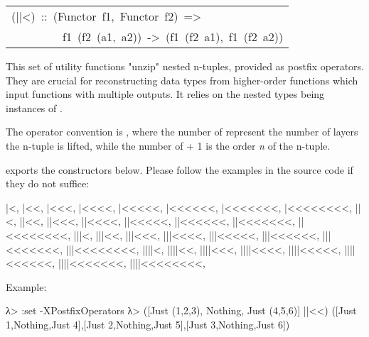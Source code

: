 \begin{haddockdesc}
\item[\begin{tabular}{@{}l}
(||<)\ ::\ (Functor\ f1,\ Functor\ f2)\ =>\\\ \ \ \ \ \ \ \ \ f1\ (f2\ (a1,\ a2))\ ->\ (f1\ (f2\ a1),\ f1\ (f2\ a2))
\end{tabular}]\haddockbegindoc
This set of utility functions "unzip" nested n-tuples, provided
 as postfix operators. They are crucial for reconstructing data
 types from higher-order functions which input functions with
 multiple outputs. It relies on the nested types being instances of
 .\par
The operator convention is \haddocktt{(|+<+)}, where the number of \haddocktt{|}
 represent the number of layers the n-tuple is lifted, while the
 number of \haddocktt{<} + 1 is the order \emph{n} of the n-tuple.\par
{} exports the constructors below. Please
 follow the examples in the source code if they do not suffice:\par
\begin{interactive}
   |<,    |<<,    |<<<,    |<<<<,    |<<<<<,    |<<<<<<,    |<<<<<<<,    |<<<<<<<<,
  ||<,   ||<<,   ||<<<,   ||<<<<,   ||<<<<<,   ||<<<<<<,   ||<<<<<<<,   ||<<<<<<<<,
 |||<,  |||<<,  |||<<<,  |||<<<<,  |||<<<<<,  |||<<<<<<,  |||<<<<<<<,  |||<<<<<<<<,  
||||<, ||||<<, ||||<<<, ||||<<<<, ||||<<<<<, ||||<<<<<<, ||||<<<<<<<, ||||<<<<<<<<, \end{interactive}
Example:\par
\begin{interactive}
λ> :set -XPostfixOperators
λ> ([Just (1,2,3), Nothing, Just (4,5,6)] ||<<)
([Just 1,Nothing,Just 4],[Just 2,Nothing,Just 5],[Just 3,Nothing,Just 6])

\end{interactive}
\end{haddockdesc}
